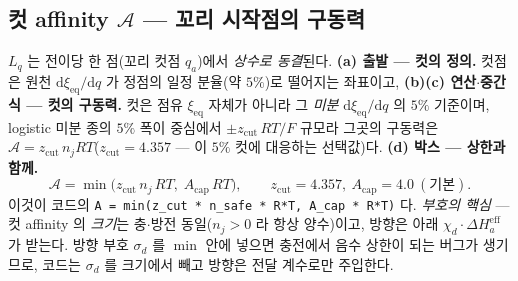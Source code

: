 \documentclass[11pt,a4paper]{article}
\newcommand{\dd}{\mathrm{d}}
\newcommand{\eff}{\mathrm{eff}}
\newcommand{\eq}{\mathrm{eq}}
\newcommand{\code}[1]{\texttt{#1}}
\begin{document}
\subsection{컷 affinity $\mathcal A$ — 꼬리 시작점의 구동력}
$L_q$ 는 전이당 한 점(꼬리 컷점 $q_a$)에서 \emph{상수로 동결}된다. \textbf{(a) 출발 — 컷의 정의.} 컷점은 원천
$\dd\xi_\eq/\dd q$ 가 정점의 일정 분율(약 $5\%$)로 떨어지는 좌표이고, \textbf{(b)(c) 연산$\cdot$중간식 — 컷의 구동력.}
컷은 점유 $\xi_\eq$ 자체가 아니라 그 \emph{미분} $\dd\xi_\eq/\dd q$ 의 $5\%$ 기준이며, logistic 미분 종의 $5\%$
폭이 중심에서 $\pm z_\mathrm{cut}\,RT/F$ 규모라 그곳의 구동력은 $\mathcal A=z_\mathrm{cut}\,n_jRT$($z_\mathrm{cut}=4.357$
— 이 $5\%$ 컷에 대응하는 선택값)다. \textbf{(d) 박스 — 상한과 함께.}
\begin{equation}
\mathcal A=\min\!\big(z_\mathrm{cut}\,n_j\,RT,\;A_\mathrm{cap}\,RT\big),
\qquad z_\mathrm{cut}=4.357,\ A_\mathrm{cap}=4.0\ (\text{기본}).
\label{eq:Acut}
\end{equation}
이것이 코드의 \code{A = min(z\_cut * n\_safe * R*T, A\_cap * R*T)} 다. \emph{부호의 핵심} — 컷 affinity 의 \emph{크기}는
충$\cdot$방전 동일($n_j>0$ 라 항상 양수)이고, 방향은 아래 $\chi_d\cdot\Delta H_a^\eff$ 가 받는다. 방향 부호 $\sigma_d$ 를
$\min$ 안에 넣으면 충전에서 음수 상한이 되는 버그가 생기므로, 코드는 $\sigma_d$ 를 크기에서 빼고 방향은 전달 계수로만
주입한다.
\end{document}
